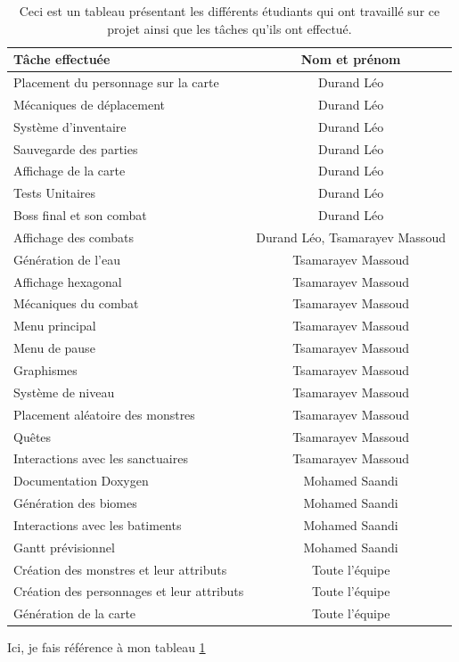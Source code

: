 \documentclass[11pt,a4paper]{article}
\begin{document}
\begin{table}[H]
\begin{tabular}{|l|c|}
\hline
Tâche effectuée & Nom et prénom \\
\hline
Placement du personnage sur la carte & Durand Léo \\
Mécaniques de déplacement & Durand Léo \\
Système d'inventaire & Durand Léo \\
Sauvegarde des parties & Durand Léo \\
Affichage de la carte & Durand Léo \\
Tests Unitaires & Durand Léo \\
Boss final et son combat & Durand Léo \\
Affichage des combats & Durand Léo, Tsamarayev Massoud \\
Génération de l'eau & Tsamarayev Massoud \\
Affichage hexagonal & Tsamarayev Massoud \\
Mécaniques du combat & Tsamarayev Massoud \\
Menu principal & Tsamarayev Massoud \\
Menu de pause & Tsamarayev Massoud \\
Graphismes & Tsamarayev Massoud \\
Système de niveau & Tsamarayev Massoud \\
Placement aléatoire des monstres & Tsamarayev Massoud \\
Quêtes & Tsamarayev Massoud \\
Interactions avec les sanctuaires & Tsamarayev Massoud \\
Documentation Doxygen & Mohamed Saandi \\
Génération des biomes & Mohamed Saandi \\
Interactions avec les batiments & Mohamed Saandi \\
Gantt prévisionnel & Mohamed Saandi \\
Création des monstres et leur attributs & Toute l'équipe \\
Création des personnages et leur attributs & Toute l'équipe \\
Génération de la carte & Toute l'équipe \\
\hline
\end{tabular}
\label{tab_taches}
\caption{Ceci est un tableau présentant les différents étudiants qui ont travaillé sur ce projet ainsi que les tâches qu'ils ont effectué.}
\end{table}
Ici, je fais référence à mon tableau \ref{tab_taches}
\end{document}
